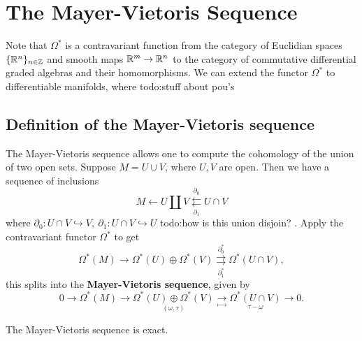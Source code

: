 \section{The Mayer-Vietoris Sequence}
Note that $\Omega^*$ is a contravariant function from the category of Euclidian spaces $\{\mathbb{R}^n \} _{n\in \mathbb{Z}}$ and smooth maps $\mathbb{R}^m \to \mathbb{R}^n $ to the category of commutative differential graded algebras and their homomorphisms. We can extend the functor $\Omega^*$ to differentiable manifolds, where {\color{red}todo:stuff about pou's} 

\subsection{Definition of the Mayer-Vietoris sequence}
The Mayer-Vietoris sequence allows one to compute the cohomology of the union of two open sets. Suppose $M=U \cup V$, where $U,V$ are open. Then we have a sequence of inclusions \[
M \leftarrow U \amalg V \underset{\partial_1 }{\overset{\partial_0}{\leftleftarrows}}  U \cap V
\] where $\partial_0 \colon U\cap V \hookrightarrow V,\ \partial_1 \colon U\cap V\hookrightarrow U$ {\color{red}todo:how is this union disjoin?} . Apply the contravariant functor $\Omega^*$ to get \[
\Omega^*(M) \to \Omega^*(U)\oplus \Omega^*(V) \underset{\partial_1^* }{\overset{\partial_0^* }{\rightrightarrows}}  \Omega^*(U \cap V),
\] this splits into the \textbf{Mayer-Vietoris sequence}, given by \[
0 \longrightarrow\Omega^*(M) \longrightarrow\underset{(\omega,\tau)}{\Omega^*(U) \oplus \Omega^*(V)} \underset{\mapsto }{\longrightarrow}  \underset{\tau - \omega}{\Omega^*(U \cap V)} \longrightarrow 0.
\] 
\begin{prop}
    The Mayer-Vietoris sequence is exact.
\end{prop}

